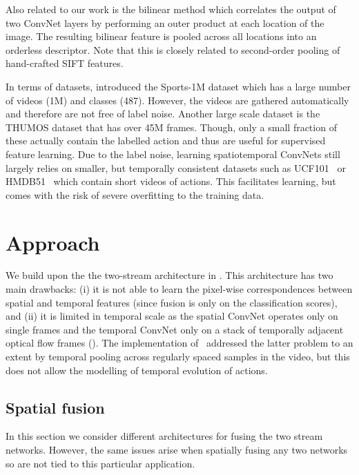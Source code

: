 \documentclass[10pt,twocolumn,letterpaper]{article}
\begin{document}
Also related to our work is the bilinear method \cite{lin2015bilinear}
which correlates the output of two ConvNet layers by performing an
outer product at each location of the image. The resulting bilinear
feature is pooled across all locations into an orderless
descriptor. Note that this is closely related to second-order pooling
\cite{Carreira12} of hand-crafted SIFT features.

In terms of datasets, \cite{Karpathy14} introduced
the Sports-1M dataset which has a large number of
videos (1M) and classes (487). However, the videos
are gathered automatically and therefore are not free of label noise. Another
large scale dataset is the THUMOS dataset
\cite{gorbanTHUMOS15} that has over 45M frames. Though, only a small
fraction of these actually contain the labelled action and thus are
useful for supervised feature learning. Due to the label noise,
learning spatiotemporal ConvNets still largely relies on smaller,
but temporally consistent datasets such as UCF101~\cite{UCF101} or
HMDB51~\cite{kuehne2011hmdb} which contain short videos of
actions. This facilitates learning, but comes with the risk of
severe overfitting to the training data.

   	
\section{Approach} \label{sec:approach}
We build upon the the two-stream architecture in
\cite{Simonyan14b}. 
This architecture has two main drawbacks: (i) it is not able
to learn the pixel-wise
correspondences between spatial and temporal features (since
fusion is only on the classification scores), and (ii) it is limited in
temporal scale as the spatial ConvNet operates only on single frames
and the temporal ConvNet only on a stack of  temporally adjacent
optical flow frames (\eg ). The implementation of~\cite{Simonyan14b} addressed the
latter problem to an extent by temporal pooling across regularly
spaced samples in the video, but this does not allow the modelling of
temporal evolution of actions.



\subsection{Spatial fusion} \label{sec:spatialFusion}

In this section we consider different architectures for fusing the two
stream networks. However, the same issues arise when spatially fusing any two
networks so are not tied to this particular application.
\end{document}

